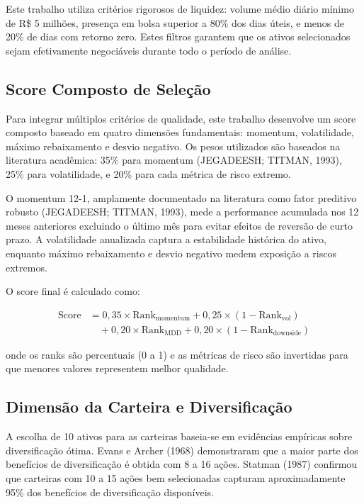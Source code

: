 Este trabalho utiliza critérios rigorosos de liquidez: volume médio diário mínimo de R\$ 5 milhões, presença em bolsa superior a 80\% dos dias úteis, e menos de 20\% de dias com retorno zero. Estes filtros garantem que os ativos selecionados sejam efetivamente negociáveis durante todo o período de análise.

\subsection{Score Composto de Seleção}

Para integrar múltiplos critérios de qualidade, este trabalho desenvolve um score composto baseado em quatro dimensões fundamentais: momentum, volatilidade, máximo rebaixamento e desvio negativo. Os pesos utilizados são baseados na literatura acadêmica: 35\% para momentum (JEGADEESH; TITMAN, 1993), 25\% para volatilidade, e 20\% para cada métrica de risco extremo.

O momentum 12-1, amplamente documentado na literatura como fator preditivo robusto (JEGADEESH; TITMAN, 1993), mede a performance acumulada nos 12 meses anteriores excluindo o último mês para evitar efeitos de reversão de curto prazo. A volatilidade anualizada captura a estabilidade histórica do ativo, enquanto máximo rebaixamento e desvio negativo medem exposição a riscos extremos.

O score final é calculado como:

\begin{align}
\text{Score} &= 0,35 \times \text{Rank}_{\text{momentum}} + 0,25 \times (1 - \text{Rank}_{\text{vol}}) \nonumber \\
&\quad + 0,20 \times \text{Rank}_{\text{MDD}} + 0,20 \times (1 - \text{Rank}_{\text{downside}})
\end{align}

onde os ranks são percentuais (0 a 1) e as métricas de risco são invertidas para que menores valores representem melhor qualidade.

\subsection{Dimensão da Carteira e Diversificação}

A escolha de 10 ativos para as carteiras baseia-se em evidências empíricas sobre diversificação ótima. Evans e Archer (1968) demonstraram que a maior parte dos benefícios de diversificação é obtida com 8 a 16 ações. Statman (1987) confirmou que carteiras com 10 a 15 ações bem selecionadas capturam aproximadamente 95\% dos benefícios de diversificação disponíveis.


